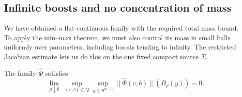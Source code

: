 \subsection{Infinite boosts and no concentration of mass}

We have obtained a flat-continuous family with the required total mass
bound. To apply the min--max theorem, we must also control its mass in
small balls uniformly over parameters, including boosts tending to
infinity. The restricted Jacobian estimate lets us do this on the one
fixed compact source \(\Sigma\).

\begin{lemma}[No concentration]\label{lem:family-no-concentration}
The family $\widehat\Phi$ satisfies
\begin{equation}\label{eq:family-no-concentration}
 \lim_{\rho\downarrow0}\;
 \sup_{(v,b)\in Q}\sup_{y\in S^{m+1}}
 \|\widehat\Phi(v,b)\|(B_\rho(y))=0.
\end{equation}
\end{lemma}

